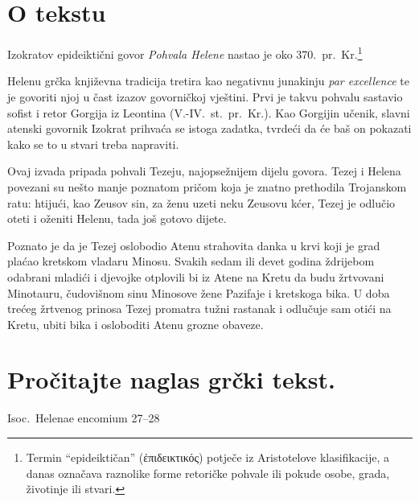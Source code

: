 
\section*{O tekstu}

Izokratov epideiktični govor \textit{Pohvala Helene} nastao je oko 370.\ pr.~Kr.\footnote{Termin ``epideiktičan'' \textgreek[variant=ancient]{(ἐπιδεικτικός)} potječe iz Aristotelove klasifikacije, a danas označava raznolike forme retoričke pohvale ili pokude osobe, grada, životinje ili stvari.}

Helenu grčka književna tradicija tretira kao negativnu junakinju \textit{par excellence} te je govoriti njoj u čast izazov govorničkoj vještini. Prvi je takvu pohvalu sastavio sofist i retor Gorgija iz Leontina (V.-IV.~st.\ pr.~Kr.). Kao Gorgijin učenik, slavni atenski govornik Izokrat prihvaća se istoga zadatka, tvrdeći da će baš on pokazati kako se to u stvari treba napraviti.

Ovaj izvada pripada pohvali Tezeju, najopsežnijem dijelu govora. Tezej i Helena povezani su nešto manje poznatom pričom koja je znatno prethodila Trojanskom ratu: htijući, kao Zeusov sin, za ženu uzeti neku Zeusovu kćer, Tezej je odlučio oteti i oženiti Helenu, tada još gotovo dijete. 

Poznato je da je Tezej oslobodio Atenu strahovita danka u krvi koji je grad plaćao kretskom vladaru Minosu. Svakih sedam ili devet godina ždrijebom odabrani mladići i djevojke otplovili bi iz Atene na Kretu da budu žrtvovani Minotauru, čudovišnom sinu Minosove žene Pazifaje i kretskoga bika. U doba trećeg žrtvenog prinosa Tezej promatra tužni rastanak i odlučuje sam otići na Kretu, ubiti bika i osloboditi Atenu grozne obaveze. 


\section*{Pročitajte naglas grčki tekst.}

Isoc.\ Helenae encomium 27–28


\medskip


